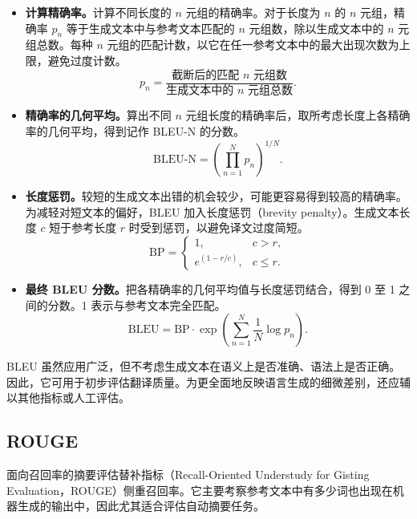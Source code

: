 \begin{itemize}
\item \textbf{计算精确率。}计算不同长度的 $n$ 元组的精确率。对于长度为 $n$ 的 $n$ 元组，精确率 $p_n$ 等于生成文本中与参考文本匹配的 $n$ 元组数，除以生成文本中的 $n$ 元组总数。每种 $n$ 元组的匹配计数，以它在任一参考文本中的最大出现次数为上限，避免过度计数。
\begin{equation}
p_n=\frac{\text{截断后的匹配 }n\text{ 元组数}}
          {\text{生成文本中的 }n\text{ 元组总数}}.
\label{eq:ch08-bleu-precision}
\end{equation}
\item \textbf{精确率的几何平均。}算出不同 $n$ 元组长度的精确率后，取所考虑长度上各精确率的几何平均，得到记作 BLEU-N 的分数。
\begin{equation}
\mathrm{BLEU\text{-}N}
=\left(\prod_{n=1}^{N}p_n\right)^{1/N}.
\label{eq:ch08-bleu-geomean}
\end{equation}
\item \textbf{长度惩罚。}较短的生成文本出错的机会较少，可能更容易得到较高的精确率。为减轻对短文本的偏好，BLEU 加入长度惩罚（brevity penalty）。生成文本长度 $c$ 短于参考长度 $r$ 时受到惩罚，以避免译文过度简短。
\begin{equation}
\mathrm{BP}=
\begin{cases}
1,& c>r,\\
e^{(1-r/c)},& c\leq r.
\end{cases}
\label{eq:ch08-bleu-penalty}
\end{equation}
\item \textbf{最终 BLEU 分数。}把各精确率的几何平均值与长度惩罚结合，得到 0 至 1 之间的分数。1 表示与参考文本完全匹配。
\begin{equation}
\mathrm{BLEU}
=\mathrm{BP}\cdot\exp\!\left(\sum_{n=1}^{N}\frac{1}{N}\log p_n\right).
\label{eq:ch08-bleu}
\end{equation}
\end{itemize}

BLEU 虽然应用广泛，但不考虑生成文本在语义上是否准确、语法上是否正确。因此，它可用于初步评估翻译质量。为更全面地反映语言生成的细微差别，还应辅以其他指标或人工评估。

\subsection{ROUGE}
面向召回率的摘要评估替补指标（Recall-Oriented Understudy for Gisting Evaluation，ROUGE）侧重召回率。它主要考察参考文本中有多少词也出现在机器生成的输出中，因此尤其适合评估自动摘要任务。

